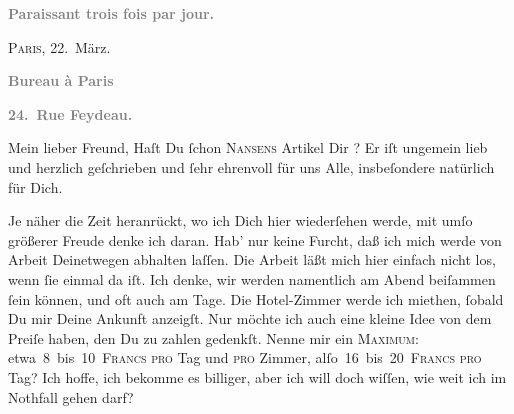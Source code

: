 \pstart
           \begin{otherlanguage}{french}\textcolor{gray}{\textbf{\textbf{Paraissant trois fois par jour.}}}\end{otherlanguage}\hfill \textsc{Paris}, 22. März.\pend
           
\pstart
           \begin{otherlanguage}{french}\textcolor{gray}{\textbf{\textbf{Bureau à Paris}}}\end{otherlanguage}\pend
           
\pstart
           \begin{otherlanguage}{french}\textcolor{gray}{\textbf{\textbf{24. Rue Feydeau.}}}\end{otherlanguage}\pend
           
\pstart\center{}Mein lieber Freund,\pend\vspace{0.5em}
\pstart
           Haſt Du{ }ſchon \textsc{Nansens}{ }Artikel Dir \label{K_L02806-1v}\label{K_L02806-1}? Er iſt ungemein lieb und herzlich geſchrieben und{ }ſehr ehrenvoll für uns
               Alle, insbeſondere natürlich für Dich.\pend
           
\pstart
           Je näher die Zeit heranrückt, wo ich Dich hier wiederſehen werde, mit umſo größerer
               Freude denke ich daran. Hab’ nur keine Furcht, daß ich mich werde von Arbeit
               Deinetwegen abhalten laſſen. Die Arbeit läßt mich hier einfach nicht los, wenn{ }ſie
               einmal da iſt. Ich denke, wir werden namentlich am Abend beiſammen{ }ſein können, und oft auch am Tage. {\pb} Die Hotel-Zimmer werde ich miethen,{ }ſobald Du mir
               Deine Ankunft anzeigſt. Nur möchte ich auch eine kleine Idee von dem Preiſe haben,
               den Du zu zahlen gedenkſt. \strikeout{\textcolor{gray}{Nenne}} Nenne mir ein \textsc{Maximum}: etwa 8 bis 10 \textsc{Francs}{ }\textsc{pro} Tag und \textsc{pro} Zimmer,
                  alſo 16 bis 20 \textsc{Francs}{ }\textsc{pro} Tag? Ich hoffe, ich bekomme es billiger, aber ich will
               doch wiſſen, wie weit ich im Nothfall gehen darf?\pend
           
